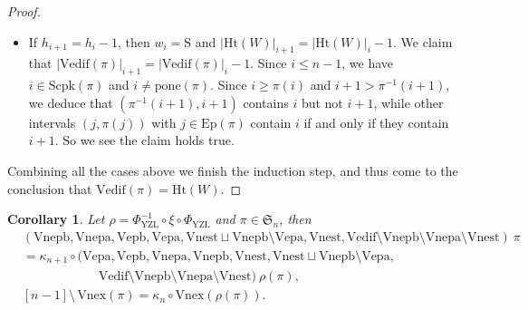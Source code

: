 \documentclass[12pt]{amsart}
\numberwithin{equation}{section}
\theoremstyle{plain}
\newtheorem{corollary}[theorem]{Corollary}
\theoremstyle{definition}
\def\YZL{\mathrm{YZL}}
\def\SS{\mathfrak{S}}
\def\S{\mathrm{S}}
\def\dE{\mathrm{dE}}
\def\Het{\mathrm{Ht}}
\def\Excp{\mathrm{Ep}}
\def\Nexcp{\mathrm{Nep}}
\def\Scpk{\mathrm{Scpk}}
\def\Scdd{\mathrm{Scdd}}
\def\Vnexpb{\mathrm{Vnepb}}
\def\Vnexpa{\mathrm{Vnepa}}
\def\Vexpb{\mathrm{Vepb}}
\def\Vexpa{\mathrm{Vepa}}
\def\Vedif{\mathrm{Vedif}}
\def\Vnex{\mathrm{Vnex}}
\def\Vnest{\mathrm{Vnest}}
\def\vbot{\mathrm{vbot}}
\def\pone{\mathrm{pone}}
\begin{document}
\begin{proof}
\begin{itemize}
\begin{itemize}
           \item If $w_i=\dE$, then we see that $i\in \Scdd(\pi)$ and $i \neq \pone(\pi)$. Since $i \geq \pi(i)$ and $i+1 \leq \pi^{-1}(i+1)$, we deduce that for every $j\in\Excp(\pi)$, the interval $(j,\pi(j))$ contains $i$ if and only if it contains $i+1$. Since $i \neq \pone(\pi)$, we see $(\pone(\pi),n]$ contains $i$ if and only if it contains $i+1$. So in this case $|\Vedif(\pi)|_{i+1}=|\Vedif(\pi)|_{i}$ holds as well.
    \end{itemize}

  \item If $h_{i+1}=h_i-1$, then $w_i=\S$ and
        $|\Het(W)|_{i+1}=|\Het(W)|_{i}-1$. We claim that $|\Vedif(\pi)|_{i+1}=|\Vedif(\pi)|_{i}-1$. Since $i \leq n-1$, we have $i\in \Scpk(\pi)$ and $i \neq \pone(\pi)$.
        Since $i\geq\pi(i)$ and $i+1>\pi^{-1}(i+1)$, we deduce that $(\pi^{-1}(i+1),i+1)$ contains $i$ but not $i+1$, while other intervals $(j,\pi(j))$ with $j\in\Excp(\pi)$ contain $i$ if and only if they contain $i+1$. So we see the claim holds true.
\end{itemize}

Combining all the cases above we finish the induction step, and thus come to the conclusion that $\Vedif(\pi)=\Het(W)$.
\end{proof}



\begin{corollary}
Let $\rho=\Phi_{\YZL}^{-1}\circ \xi \circ \Phi_{\YZL}$ and $\pi \in \SS_n$, then
\begin{align*}
  &(\Vnexpb,\Vnexpa,\Vexpb,\Vexpa,\Vnest \sqcup \Vnexpb \setminus \Vexpa ,\Vnest,\Vedif  \setminus \Vnexpb\setminus\Vnexpa \setminus \Vnest) \: \pi \\[4pt]
&=\kappa_{n+1} \circ (\Vexpa,\Vexpb,\Vnexpa,\Vnexpb,\Vnest,\Vnest \sqcup \Vnexpb \setminus \Vexpa,\\
&\qquad\qquad\qquad \Vedif  \setminus \Vnexpb\setminus\Vnexpa\setminus \Vnest) \:\rho(\pi),\\[4pt]
&[n-1] \setminus\,  \Vnex(\pi)=  \kappa_{n} \circ \Vnex(\rho(\pi)).
\end{align*}
\end{corollary}
\end{document}
